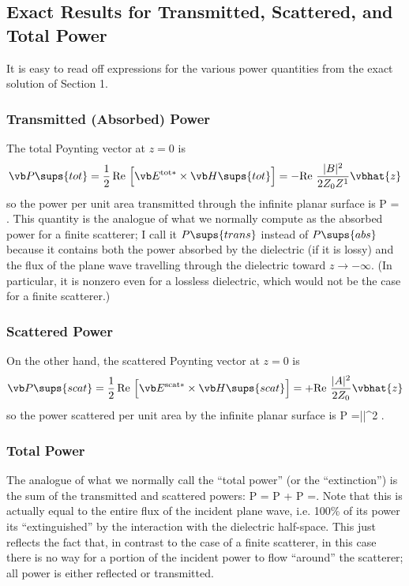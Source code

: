\documentclass{article}
\begin{document}
\subsection{Exact Results for Transmitted, Scattered, and Total Power}

It is easy to read off expressions for the various power quantities 
from the exact solution of Section 1.

\subsubsection*{Transmitted (Absorbed) Power}
The total Poynting vector at $z=0$ is 
$$
 \vb P\sups{tot}
=\frac{1}{2}\,\text{Re }
 \Big[\vb E^{\text{\scriptsize{tot}}*} \times \vb H\sups{tot}\Big]
=-\text{Re } \frac{|B|^2}{2Z_0 Z^1}\vbhat{z}
$$
so the power per unit area transmitted through the infinite planar 
surface is 
{ P
  = \cdot {}.
}
This quantity is the analogue of what we normally compute as 
the absorbed power for a finite scatterer; I call it $P\sups{trans}$
instead of $P\sups{abs}$ because it contains both the power absorbed 
by the dielectric (if it is lossy) and the flux of the plane wave 
travelling through the dielectric toward $z\to-\infty$. (In 
particular, it is nonzero even for a lossless dielectric, which
would not be the case for a finite scatterer.)

\subsubsection*{Scattered Power}
On the other hand, the scattered Poynting vector at $z=0$ is 
$$
 \vb P\sups{scat}
=\frac{1}{2}\,\text{Re }
 \Big[\vb E^{\text{\scriptsize{scat}}*} \times \vb H\sups{scat}\Big]
=+\text{Re } \frac{|A|^2}{2Z_0}\vbhat{z}
$$
so the power scattered per unit area by the infinite planar 
surface is 
{ P
  =\left|\right|^2 \cdot {}.
}

\subsubsection*{Total Power}
The analogue of what we normally call the ``total power''
(or the ``extinction'') is the sum of the transmitted and 
scattered powers:
{
  P = P + P
=.
}
Note that this is actually equal to the entire flux of 
the incident plane wave, i.e. 100\% of its power its
``extinguished'' by the interaction with the dielectric
half-space. This just reflects the fact that, in contrast
to the case of a finite scatterer, in this case there is
no way for a portion of the incident power to flow ``around''
the scatterer; all power is either reflected or transmitted.
\end{document}
